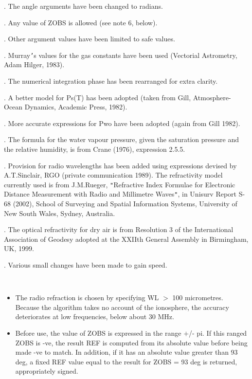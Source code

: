 \documentclass[twoside,11pt]{article}
\renewcommand{\_}{\texttt{\symbol{95}}}
\newcommand{\sstitemlist}[1]{
  \mbox{} \\
  \vspace{-3.5ex}
  \begin{itemize}
     #1
  \end{itemize}
}
\newcommand{\sstitem}{\item}
\newcommand{\sstitemlist}[1]{
      \begin{itemize}
         #1
      \end{itemize}
      \\
   }
\newcommand{\sstitem}{\item}
\begin{document}
{{{      }
      .  The angle arguments have been changed to radians.

      .  Any value of ZOBS is allowed (see note 6, below).

      .  Other argument values have been limited to safe values.

      .  Murray{\tt '}s values for the gas constants have been used
         (Vectorial Astrometry, Adam Hilger, 1983).

      .  The numerical integration phase has been rearranged for
         extra clarity.

      .  A better model for Ps(T) has been adopted (taken from
         Gill, Atmosphere-Ocean Dynamics, Academic Press, 1982).

      .  More accurate expressions for Pwo have been adopted
         (again from Gill 1982).

      .  The formula for the water vapour pressure, given the
         saturation pressure and the relative humidity, is from
         Crane (1976), expression 2.5.5.

      .  Provision for radio wavelengths has been added using
         expressions devised by A.T.Sinclair, RGO (private
         communication 1989).  The refractivity model currently
         used is from J.M.Rueger, {\tt "}Refractive Index Formulae for
         Electronic Distance Measurement with Radio and Millimetre
         Waves{\tt "}, in Unisurv Report S-68 (2002), School of Surveying
         and Spatial Information Systems, University of New South
         Wales, Sydney, Australia.

      .  The optical refractivity for dry air is from Resolution 3 of
         the International Association of Geodesy adopted at the XXIIth
         General Assembly in Birmingham, UK, 1999.

      .  Various small changes have been made to gain speed.

      \sstitemlist{

         \sstitem
         The radio refraction is chosen by specifying WL $>$ 100 micrometres.
         Because the algorithm takes no account of the ionosphere, the
         accuracy deteriorates at low frequencies, below about 30 MHz.

         \sstitem
         Before use, the value of ZOBS is expressed in the range $+$/- pi.
         If this ranged ZOBS is -ve, the result REF is computed from its
         absolute value before being made -ve to match.  In addition, if
         it has an absolute value greater than 93 deg, a fixed REF value
         equal to the result for ZOBS = 93 deg is returned, appropriately
         signed.

}}}
\end{document}
